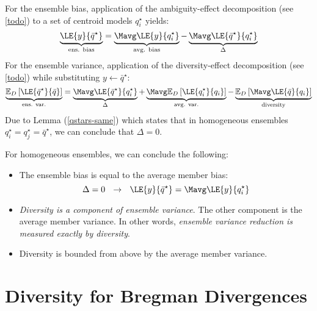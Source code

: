\documentclass[../main.tex]{subfiles}
\begin{document}
For the ensemble bias, application of the ambiguity-effect decomposition (see \ref{todo}) to a set of centroid models $q_{i}^\star$ yields:
$$
\underbrace{
\LE{y}{\bar{q}^\star} 
}_{\text{ens. bias}}
= 
\underbrace{
\Mavg \LE{y}{q_{i}^\star}
}_{\text{avg. bias}}
- 
\underbrace{
\Mavg\LE{\bar{q}^\star}{q_{i}^\star}
}_{\Delta}
$$
For the ensemble variance, application of the diversity-effect decomposition (see \ref{todo}) while substituting $y \gets \bar{q}^\star$:
$$
\underbrace{
\mathbb{E}_{D}\left[ \LE{\bar{q}^\star}{\bar{q}} \right]
}_{\text{ens. var.}}
 = 
\underbrace{
\Mavg \LE{\bar{q}^\star}{q_{i}^\star} 
}_{\Delta}
+ 
\underbrace{
\Mavg \mathbb{E}_{D}\left[ \LE{q_{i}^\star}{q_{i}} \right] 
}_{\text{avg. var.}}
- 
\underbrace{
\mathbb{E}_{D}\left[ \Mavg \LE{\bar{q}}{q_{i}} \right] 
}_{\text{diversity}}
$$
Due to Lemma (\ref{qstars-same}) which states that in homogeneous ensembles $q_{i}^\star = q_{j}^\star = \bar{q}^\star$, we can conclude that $\Delta = 0$. 
\begin{corollary} For homogeneous ensembles, we can conclude the following:
\begin{itemize}
    \item The ensemble bias is equal to the average member bias:
$$
\Delta = 0 ~ ~ \rightarrow ~ ~ \LE{y}{\bar{q}^\star} = \Mavg \LE{y}{q_{i}^\star}
$$
\item \textit{Diversity is a component of ensemble variance}. The other component is the average member variance. In other words, \textit{ensemble variance reduction is measured exactly by diversity}. 
\item Diversity is bounded from above by the average member variance.
\end{itemize}
\end{corollary}








\section{Diversity for Bregman Divergences} \label{sec:bregman-divergences}
\end{document}
